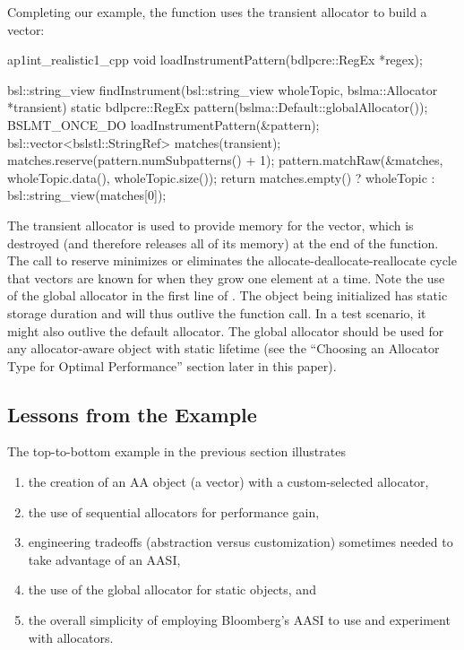 Completing our example, the  function uses the transient
allocator to build a vector:
\begin{cppcodeblock}{ap1int_realistic1_cpp}
    void loadInstrumentPattern(bdlpcre::RegEx *regex);

    bsl::string_view findInstrument(bsl::string_view wholeTopic,
                                    bslma::Allocator *transient)
    {
         static bdlpcre::RegEx pattern(bslma::Default::globalAllocator());
         BSLMT_ONCE_DO { loadInstrumentPattern(&pattern); }
         bsl::vector<bslstl::StringRef> matches(transient);
         matches.reserve(pattern.numSubpatterns() + 1);
         pattern.matchRaw(&matches, wholeTopic.data(), wholeTopic.size());
         return matches.empty() ? wholeTopic : bsl::string_view(matches[0]);
    }
\end{cppcodeblock}
The transient allocator is used to provide memory for the vector, which is
destroyed (and therefore releases all of its memory) at the end of the function.
The call to reserve minimizes or eliminates the allocate-deallocate-reallocate
cycle that vectors are known for when they grow one element at a time.
Note the use of the global allocator in the first line of . The
object being initialized has static storage duration and will thus outlive the
function call. In a test scenario, it might also outlive the default allocator. The
global allocator should be used for any allocator-aware object with static
lifetime (see the “Choosing an Allocator Type for Optimal Performance” section
later in this paper).

\subsection{Lessons from the  Example}

The top-to-bottom example in the previous section illustrates
\begin{enumerate}
\item the creation of an AA object (a vector) with a custom-selected allocator,
\item the use of sequential allocators for performance gain,
\item engineering tradeoffs (abstraction versus customization) sometimes
needed to take advantage of an AASI,
\item the use of the global allocator for static objects, and
\item the overall simplicity of employing Bloomberg’s AASI to use and
  experiment with allocators.
\end{enumerate}

